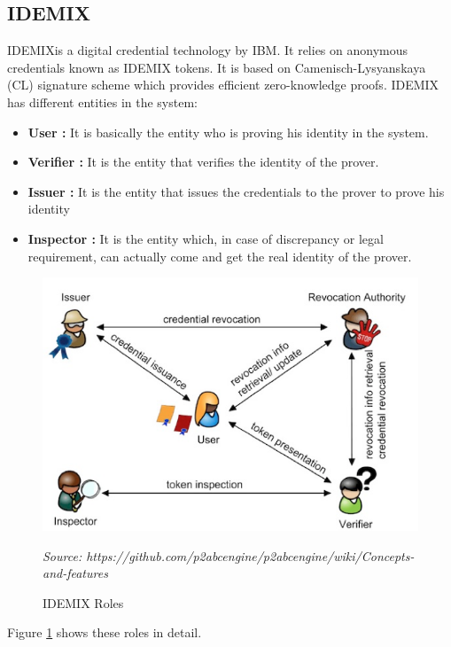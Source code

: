 \subsection{IDEMIX}
IDEMIX\cite{camenisch2001efficient}\cite{camenisch2002design}is a digital credential technology by IBM. It relies on anonymous credentials known as IDEMIX tokens. It is based on Camenisch-Lysyanskaya (CL) signature scheme\cite{camenisch2003signature} which provides efficient zero-knowledge proofs. IDEMIX  has different entities in the system:
\begin{itemize}
	\item \textbf{User :} It is basically the entity who is proving his identity in the system.
	\item \textbf{Verifier :} It is the entity that verifies the identity of the prover.
	\item \textbf{Issuer :} It is the entity that issues the credentials to the prover to prove his identity
	\item \textbf{Inspector :} It is the entity which, in case of discrepancy or legal requirement, can actually come and get the real identity of the prover.
\end{itemize}
\begin{figure}[h]
	\centering
	\includegraphics[width=\textwidth]{figures/Roles}
	\begin{minipage}{\textwidth}
		\footnotesize
		\emph{Source: https://github.com/p2abcengine/p2abcengine/wiki/Concepts-and-features}
	\end{minipage}
	\caption{IDEMIX Roles}
	\label{fig:Roles}
\end{figure}
Figure \ref{fig:Roles} shows these roles in detail.

